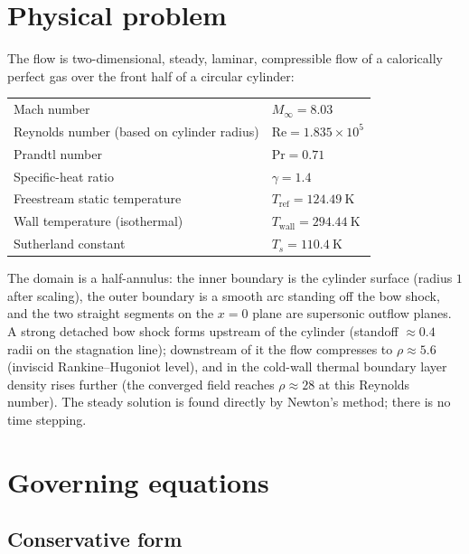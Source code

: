 \documentclass[11pt]{article}
\newcommand{\Minf}{M_\infty}
\newcommand{\Rey}{\mathrm{Re}}
\newcommand{\Pran}{\mathrm{Pr}}
\begin{document}
\section{Physical problem}

The flow is two-dimensional, steady, laminar, compressible flow of a
calorically perfect gas over the front half of a circular cylinder:
\begin{center}
\begin{tabular}{ll}
\toprule
Mach number & $\Minf = 8.03$ \\
Reynolds number (based on cylinder radius) & $\Rey = 1.835\times 10^{5}$ \\
Prandtl number & $\Pran = 0.71$ \\
Specific-heat ratio & $\gamma = 1.4$ \\
Freestream static temperature & $T_{\mathrm{ref}} = 124.49~\mathrm{K}$ \\
Wall temperature (isothermal) & $T_{\mathrm{wall}} = 294.44~\mathrm{K}$ \\
Sutherland constant & $T_s = 110.4~\mathrm{K}$ \\
\bottomrule
\end{tabular}
\end{center}
The domain is a half-annulus: the inner boundary is the cylinder surface
(radius $1$ after scaling), the outer boundary is a smooth arc standing off
the bow shock, and the two straight segments on the $x=0$ plane are supersonic
outflow planes. A strong detached bow shock forms upstream of the cylinder
(standoff $\approx 0.4$ radii on the stagnation line); downstream of it the
flow compresses to $\rho \approx 5.6$ (inviscid Rankine--Hugoniot level), and
in the cold-wall thermal boundary layer density rises further (the converged
field reaches $\rho \approx 28$ at this Reynolds number). The steady solution
is found directly by Newton's method; there is no time stepping.

\section{Governing equations}

\subsection{Conservative form}
\end{document}
